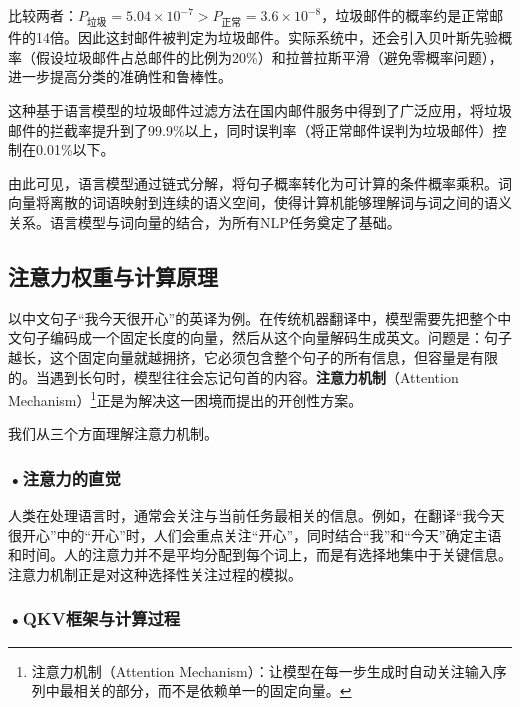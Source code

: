 比较两者：$P_{\text{垃圾}} = 5.04 \times 10^{-7} > P_{\text{正常}} = 3.6 \times 10^{-8}$，垃圾邮件的概率约是正常邮件的14倍。因此这封邮件被判定为垃圾邮件。实际系统中，还会引入贝叶斯先验概率（假设垃圾邮件占总邮件的比例为20\%）和拉普拉斯平滑（避免零概率问题），进一步提高分类的准确性和鲁棒性。

这种基于语言模型的垃圾邮件过滤方法在国内邮件服务中得到了广泛应用，将垃圾邮件的拦截率提升到了99.9\%以上，同时误判率（将正常邮件误判为垃圾邮件）控制在0.01\%以下。

由此可见，语言模型通过链式分解，将句子概率转化为可计算的条件概率乘积。词向量将离散的词语映射到连续的语义空间，使得计算机能够理解词与词之间的语义关系。语言模型与词向量的结合，为所有NLP任务奠定了基础。





\subsection{注意力权重与计算原理}
以中文句子“我今天很开心”的英译为例。在传统机器翻译中，模型需要先把整个中文句子编码成一个固定长度的向量，然后从这个向量解码生成英文。问题是：句子越长，这个固定向量就越拥挤，它必须包含整个句子的所有信息，但容量是有限的。当遇到长句时，模型往往会忘记句首的内容。\textbf{注意力机制}（Attention Mechanism）\footnote{注意力机制（Attention Mechanism）：让模型在每一步生成时自动关注输入序列中最相关的部分，而不是依赖单一的固定向量。}正是为解决这一困境而提出的开创性方案。



我们从三个方面理解注意力机制。

\subsubsection*{\textbf{•注意力的直觉}}

人类在处理语言时，通常会关注与当前任务最相关的信息。例如，在翻译“我今天很开心”中的“开心”时，人们会重点关注“开心”，同时结合“我”和“今天”确定主语和时间。人的注意力并不是平均分配到每个词上，而是有选择地集中于关键信息。注意力机制正是对这种选择性关注过程的模拟。

\subsubsection*{\textbf{•QKV框架与计算过程}}

